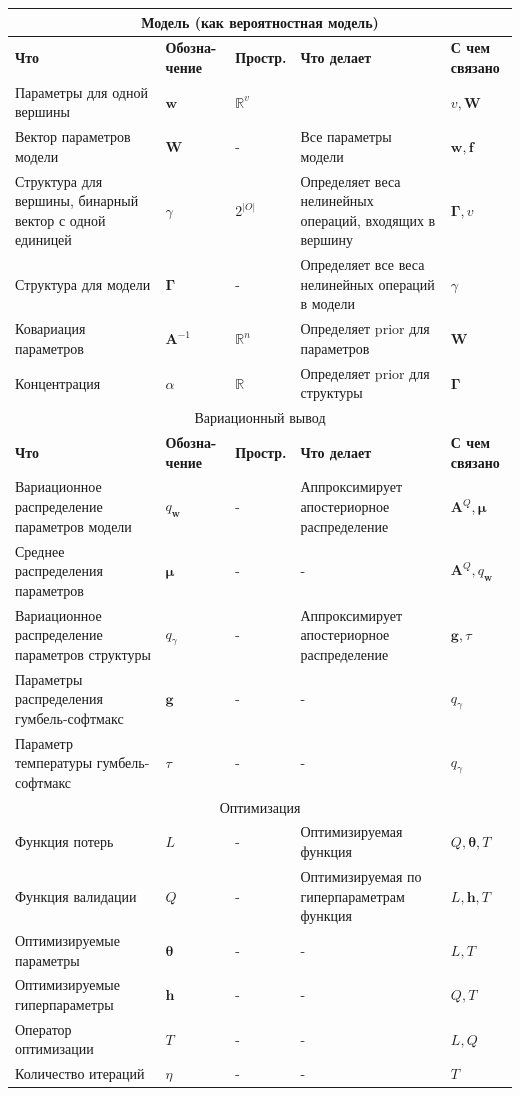 \documentclass[12pt]{article}
\begin{document}
\begin{table}[tbh!]
\small
\begin{tabularx}{\textwidth}{|X|p{1.5cm}|p{1.5cm}|X|p{1.5cm}|}
\hline
\multicolumn{5}{c}{Модель (как вероятностная модель)}\\\hline
\bf Что & \bf Обозна- чение & \bf Простр. & \bf Что делает & \bf С чем связано  \\ \hline \hline
Параметры для одной вершины & $\mathbf{w}$ & $\mathbb{R}^{v}$ & & $v, \mathbf{W}$ \\ \hline 
Вектор параметров модели & $\mathbf{W}$ & - & Все параметры модели & $\mathbf{w}, \mathbf{f}$ \\ \hline
Структура для вершины, бинарный вектор с одной единицей & $\gamma$ & $2^{|O|}$ & Определяет веса нелинейных операций, входящих в вершину & $\boldsymbol{\Gamma}, v$ \\ \hline
Структура для модели & $\boldsymbol{\Gamma}$ & - & Определяет все веса нелинейных операций в модели & $\gamma$ \\ \hline
Ковариация параметров & $\mathbf{A}^{-1}$ & $\mathbb{R}^n$ & Определяет prior для параметров & $\mathbf{W}$ \\ \hline
Концентрация & $\alpha$  & $\mathbb{R}$ & Определяет prior для структуры & $\boldsymbol{\Gamma}$ \\ \hline
 
\multicolumn{5}{c}{Вариационный вывод}\\\hline
\bf Что & \bf Обозна- чение & \bf Простр. & \bf Что делает & \bf С чем связано  \\ \hline \hline
Вариационное распределение параметров модели & $q_\mathbf{w}$ &  - & Аппроксимирует апостериорное распределение & $\mathbf{A}^Q, \boldsymbol{\mu}$ \\ \hline
Среднее распределения параметров & $\boldsymbol{\mu}$ & - & - & $\mathbf{A}^Q, q_\mathbf{w}$ \\ \hline
Вариационное распределение параметров структуры & $q_\gamma$ & - & Аппроксимирует апостериорное распределение & $\mathbf{g}, \tau$ \\ \hline
Параметры распределения гумбель-софтмакс & $\mathbf{g}$ & - & - & $q_\gamma$ \\ \hline
Параметр температуры гумбель-софтмакс & $\tau$ & - & - & $q_\gamma$ \\ \hline

\multicolumn{5}{c}{Оптимизация}\\\hline
Функция потерь & $L$ &-& Оптимизируемая функция & $Q, \boldsymbol{\theta}, T$ \\ \hline 
Функция валидации & $Q$ & - & Оптимизируемая по гиперпараметрам функция & $L, \mathbf{h}, T$\\ \hline
Оптимизируемые параметры & $\boldsymbol{\theta}$ & - & - & $L, T$ \\ \hline
Оптимизируемые гиперпараметры & $\mathbf{h}$ & - & - &  $Q, T$ \\ \hline
Оператор оптимизации & $T$ & - & - &$L,Q$ \\ \hline
Количество итераций & $\eta$ & - & - & $T$ \\ \hline

\end{tabularx}

\end{table}
\end{document}
